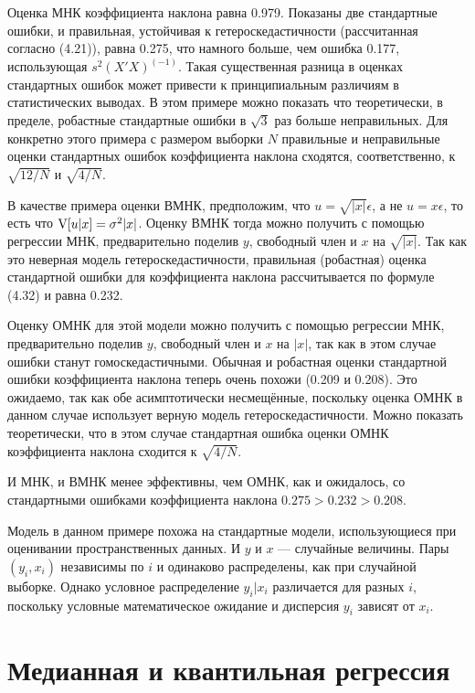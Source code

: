 Оценка МНК коэффициента наклона равна 0.979. Показаны две стандартные ошибки, и правильная, устойчивая к гетероскедастичности (рассчитанная согласно (4.21)), равна 0.275, что намного больше, чем ошибка 0.177, использующая $s^2(X'X)^(-1)$. Такая существенная разница в оценках стандартных ошибок может привести к принципиальным различиям в статистических выводах. В этом примере можно показать что теоретически, в пределе, робастные стандартные ошибки в $\sqrt{3}$ раз больше неправильных. Для конкретно этого примера с размером выборки $N$ правильные и неправильные оценки стандартных ошибок коэффициента наклона сходятся, соответственно, к $\sqrt{12 / N}$ и $\sqrt{4 / N}$. 

В качестве примера оценки ВМНК, предположим, что $u = \sqrt{|x|}\epsilon$, а не $u = x\epsilon$, то есть что $\mathrm{V} [u|x] = \sigma^2 |x|$. Оценку ВМНК тогда можно получить с помощью регрессии МНК, предварительно поделив $y$, свободный член и $x$ на $\sqrt{|x|}$. Так как это неверная модель гетероскедастичности, правильная (робастная) оценка стандартной ошибки для коэффициента наклона рассчитывается по формуле (4.32) и равна 0.232.

Оценку ОМНК для этой модели можно получить с помощью регрессии МНК, предварительно поделив $y$, свободный член и $x$ на $|x|$, так как в этом случае ошибки станут гомоскедастичными. Обычная и робастная оценки стандартной ошибки коэффициента наклона теперь очень похожи (0.209 и 0.208). Это ожидаемо, так как обе асимптотически несмещённые, поскольку оценка ОМНК в данном случае использует верную модель гетероскедастичности. Можно показать теоретически, что в этом случае стандартная ошибка оценки ОМНК коэффициента наклона сходится к $\sqrt{4 / N}$. 

И МНК, и ВМНК менее эффективны, чем ОМНК, как и ожидалось, со стандартными ошибками коэффициента наклона $0.275 >  0.232 > 0.208$.

Модель в данном примере похожа на стандартные модели, использующиеся при оценивании пространственных данных. И $y$ и $x$ --- случайные величины.  Пары $(y_i, x_i)$ независимы по $i$ и одинаково распределены, как при случайной выборке. Однако условное распределение $y_i|x_i$ различается для разных $i$, поскольку условные математическое ожидание и дисперсия $y_i$ зависят от $x_i$.

\section{Медианная и квантильная регрессия}

